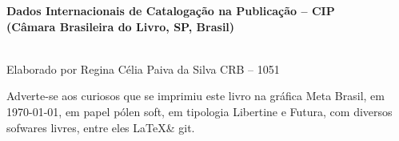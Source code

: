 \pagebreak

\ifodd\thepage\blankpage\fi

\parindent=0pt
\footnotesize\thispagestyle{empty}

\noindent\textbf{Dados Internacionais de Catalogação na Publicação -- CIP}\\
\noindent\textbf{(Câmara Brasileira do Livro, SP, Brasil)}\\

\dotfill\\





\dotfill

\noindent{}Elaborado por Regina Célia Paiva da Silva CRB -- 1051\\
\mbox{}\vfill


\begin{center}
		\begin{minipage}{.7\textwidth}\tiny\noindent{}
		\centering\small
		Adverte-se aos curiosos que se imprimiu este 
		livro na gráfica Meta Brasil, 
		em \today, em papel pólen soft, em tipologia Libertine e Futura, 
		com diversos sofwares livres, 
		entre eles \LaTeX \& git.\\ 
		\medskip\\\
		\end{minipage}
\end{center}